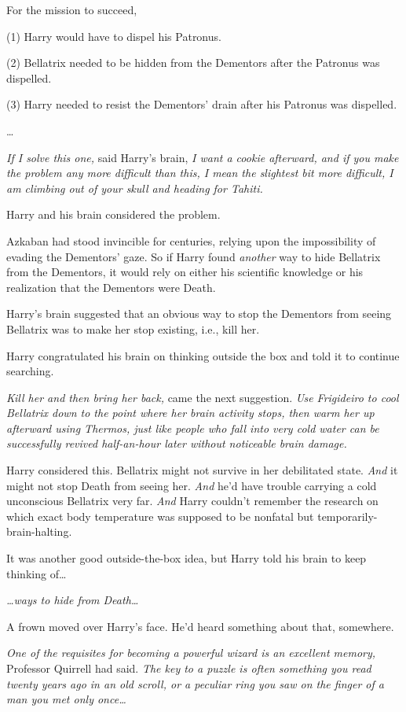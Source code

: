For the mission to succeed,

(1) Harry would have to dispel his Patronus.

(2) Bellatrix needed to be hidden from the Dementors after the Patronus was 
dispelled.

(3) Harry needed to resist the Dementors' drain after his Patronus was 
dispelled.

{\ldots}

\emph{If I solve this one,} said Harry's brain, \emph{I want a cookie 
afterward, and if you make the problem any more difficult than this, I mean the 
slightest bit more difficult, I am climbing out of your skull and heading for 
Tahiti.}

Harry and his brain considered the problem.

Azkaban had stood invincible for centuries, relying upon the impossibility of 
evading the Dementors' gaze. So if Harry found \emph{another} way to hide 
Bellatrix from the Dementors, it would rely on either his scientific knowledge 
or his realization that the Dementors were Death.

Harry's brain suggested that an obvious way to stop the Dementors from seeing 
Bellatrix was to make her stop existing, i.e., kill her.

Harry congratulated his brain on thinking outside the box and told it to 
continue searching.

\emph{Kill her and then bring her back,} came the next suggestion. \emph{Use 
Frigideiro to cool Bellatrix down to the point where her brain activity stops, 
then warm her up afterward using Thermos, just like people who fall into very 
cold water can be successfully revived half-an-hour later without noticeable 
brain damage.}

Harry considered this. Bellatrix might not survive in her debilitated state. 
\emph{And} it might not stop Death from seeing her. \emph{And} he'd have 
trouble carrying a cold unconscious Bellatrix very far. \emph{And} Harry 
couldn't remember the research on which exact body temperature was supposed to 
be nonfatal but temporarily-brain-halting.

It was another good outside-the-box idea, but Harry told his brain to keep 
thinking of{\ldots}

\emph{{\ldots}ways to hide from Death{\ldots}}

A frown moved over Harry's face. He'd heard something about that, somewhere.

\emph{One of the requisites for becoming a powerful wizard is an excellent 
memory,} Professor Quirrell had said. \emph{The key to a puzzle is often 
something you read twenty years ago in an old scroll, or a peculiar ring you 
saw on the finger of a man you met only once{\ldots}}

